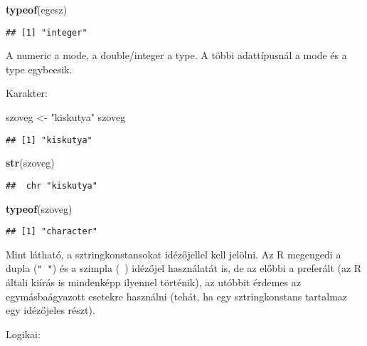 \documentclass[
]{book}
\newenvironment{Shaded}{\begin{snugshade}}{\end{snugshade}}
\newcommand{\KeywordTok}[1]{\textcolor[rgb]{0.13,0.29,0.53}{\textbf{#1}}}
\newcommand{\NormalTok}[1]{#1}
\newcommand{\StringTok}[1]{\textcolor[rgb]{0.31,0.60,0.02}{#1}}
\begin{document}
\begin{Shaded}
\begin{Highlighting}[]
\KeywordTok{typeof}\NormalTok{(egesz)}
\end{Highlighting}
\end{Shaded}

\begin{verbatim}
## [1] "integer"
\end{verbatim}

A numeric a mode, a double/integer a type. A többi adattípusnál a mode és a type egybeesik.

Karakter:

\begin{Shaded}
\begin{Highlighting}[]
\NormalTok{szoveg <-}\StringTok{ "kiskutya"}
\NormalTok{szoveg}
\end{Highlighting}
\end{Shaded}

\begin{verbatim}
## [1] "kiskutya"
\end{verbatim}

\begin{Shaded}
\begin{Highlighting}[]
\KeywordTok{str}\NormalTok{(szoveg)}
\end{Highlighting}
\end{Shaded}

\begin{verbatim}
##  chr "kiskutya"
\end{verbatim}

\begin{Shaded}
\begin{Highlighting}[]
\KeywordTok{typeof}\NormalTok{(szoveg)}
\end{Highlighting}
\end{Shaded}

\begin{verbatim}
## [1] "character"
\end{verbatim}

Mint látható, a sztringkonstansokat idézőjellel kell jelölni. Az R megengedi a dupla (\texttt{"\ "}) és a szimpla (\texttt{\textquotesingle{}\ \textquotesingle{}}) idézőjel használatát is, de az előbbi a preferált (az R általi kiírás is mindenképp ilyennel történik), az utóbbit érdemes az egymásbaágyazott esetekre használni (tehát, ha egy sztringkonstans tartalmaz egy idézőjeles részt).

Logikai:
\end{document}
